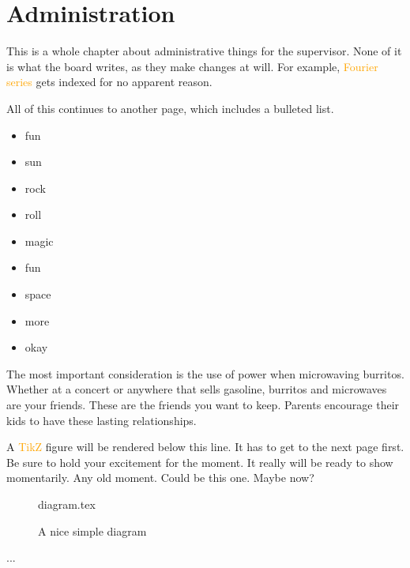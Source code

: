 \documentclass[float=false, crop=false]{standalone}
\begin{document}
\chapter{Administration}
This is a whole chapter about administrative things for the supervisor. None of it is what the board writes, as they make changes at will. For example, \textcolor{orange}{Fourier series}
 gets indexed for no apparent reason.


All of this continues to another page, which includes a bulleted list.
\begin{itemize}
\item fun
\item sun 
\item rock
\item roll
\item magic
\item fun
\item space
\item more
\item okay
\end{itemize}


The most important consideration is the use of power when microwaving burritos. Whether at a concert or anywhere that sells gasoline, burritos and microwaves are your friends. These are the friends you want to keep. Parents encourage their kids to have these lasting relationships. 

A \textcolor{orange}{TikZ}
 figure will be rendered below this line. It has to get to the next page first. Be sure to hold your excitement for the moment. It really will be ready to show momentarily. Any old moment. Could be this one. Maybe now? 
 \begin{figure}[ht]
 {diagram.tex}
 \label{fig:tikzexample}
\caption{A nice simple diagram}
\end{figure}
 ...
\end{document}
